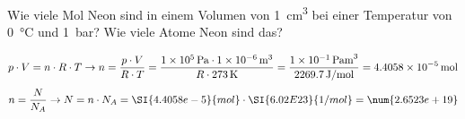 \begin{aufgabe}
	Wie viele Mol Neon sind in einem Volumen von \SI{1}{cm^3} bei einer Temperatur von \SI{0}{\celsius} und \SI{1}{bar}?
	Wie viele Atome Neon sind das?
	\begin{loesung}
		\begin{eqnarray*}
			p\cdot V=n\cdot R\cdot T \to n=\frac{p\cdot V}{R\cdot T}=\frac{\SI{1E5}{Pa}\cdot\SI{1E-6}{m^3}}{R\cdot\SI{273}{K}}=\frac{\SI{1E-1}{Pa m^3}}{\SI{2269.7}{J/mol}}=\SI{4.4058e-5}{mol}
		\end{eqnarray*}
		\begin{eqnarray*}
			n=\frac{N}{N_A}\to N=n\cdot N_A=\SI{4.4058e-5}{mol}\cdot\SI{6.02E23}{1/mol}=\num{2.6523e+19}
		\end{eqnarray*}
	\end{loesung}
\end{aufgabe}
